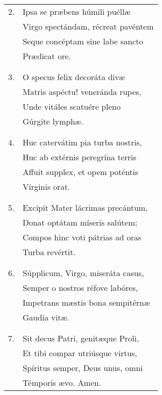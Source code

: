 \begin{longtable}{ll}
2. &Ipsa se præbens húmili puéllæ\\
&Virgo spectándam, récreat pavéntem\\
&Seque concéptam sine labe sancto\\
&Prædicat ore.\\
\\\\
3. &O specus felix decoráta divæ\\
&Matris aspéctu! veneránda rupes,\\
&Unde vitáles scatuére pleno\\
&Gúrgite lymphæ.\\
\\\\
4. &Huc catervátim pia turba nostris,\\
&Huc ab extérnis peregrína terris\\
&Affuit supplex, et opem poténtis\\
&Vírginis orat.\\
\\\\
5. &Excipit Mater lácrimas precántum,\\
&Donat optátam míseris salútem;\\
&Compos hinc voti pátrias ad oras\\
&Turba revértit.\\
\\\\
6. &Súpplicum, Virgo, miseráta casus,\\
&Semper o nostros réfove labóres,\\
&Impetrans mæstis bona sempitérnæ\\
&Gaudia vitæ.\\
\\\\
7. &Sit decus Patri, genitæque Proli,\\
&Et tibi compar utriúsque virtus,\\
&Spíritus semper, Deus unus, omni\\
&Témporis ævo.  Amen.
\end{longtable}
